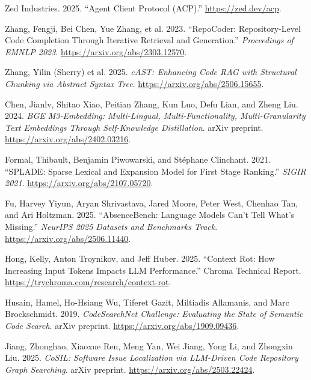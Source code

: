 \documentclass[
  11pt,
  letterpaper,
  numbers=noendperiod,
  parskip=half]{scrartcl}
\newlength{\cslhangindent}
\newenvironment{CSLReferences}[2] %
 {\begin{list}{}{%
  \setlength{\itemindent}{0pt}
  \setlength{\leftmargin}{0pt}
  \setlength{\parsep}{0pt}
  \ifodd #1
   \setlength{\leftmargin}{\cslhangindent}
   \setlength{\itemindent}{-1\cslhangindent}
  \fi
  \setlength{\itemsep}{#2\baselineskip}}}
 {\end{list}}
\begin{document}
\begin{CSLReferences}{1}{1}
Zed Industries. 2025. {``Agent Client Protocol ({ACP}).''}
\url{https://zed.dev/acp}.

Zhang, Fengji, Bei Chen, Yue Zhang, et al. 2023. {``{RepoCoder}:
Repository-Level Code Completion Through Iterative Retrieval and
Generation.''} \emph{Proceedings of EMNLP 2023}.
\url{https://arxiv.org/abs/2303.12570}.

{Zhang, Yilin (Sherry) et al.} 2025. \emph{{cAST}: Enhancing Code RAG
with Structural Chunking via Abstract Syntax Tree}.
\url{https://arxiv.org/abs/2506.15655}.

Chen, Jianlv, Shitao Xiao, Peitian Zhang, Kun Luo, Defu Lian, and Zheng
Liu. 2024. \emph{{BGE M3}-Embedding: Multi-Lingual,
Multi-Functionality, Multi-Granularity Text Embeddings Through
Self-Knowledge Distillation}. arXiv preprint.
\url{https://arxiv.org/abs/2402.03216}.

Formal, Thibault, Benjamin Piwowarski, and Stéphane Clinchant. 2021.
{``{SPLADE}: Sparse Lexical and Expansion Model for First Stage
Ranking.''} \emph{SIGIR 2021}. \url{https://arxiv.org/abs/2107.05720}.

Fu, Harvey Yiyun, Aryan Shrivastava, Jared Moore, Peter West, Chenhao
Tan, and Ari Holtzman. 2025. {``AbsenceBench: Language Models Can't Tell
What's Missing.''} \emph{NeurIPS 2025 Datasets and Benchmarks Track}.
\url{https://arxiv.org/abs/2506.11440}.

Hong, Kelly, Anton Troynikov, and Jeff Huber. 2025. {``Context Rot: How
Increasing Input Tokens Impacts LLM Performance.''} Chroma Technical
Report. \url{https://trychroma.com/research/context-rot}.

Husain, Hamel, Ho-Hsiang Wu, Tiferet Gazit, Miltiadis Allamanis, and
Marc Brockschmidt. 2019. \emph{CodeSearchNet Challenge: Evaluating the
State of Semantic Code Search}. arXiv preprint.
\url{https://arxiv.org/abs/1909.09436}.

Jiang, Zhonghao, Xiaoxue Ren, Meng Yan, Wei Jiang, Yong Li, and Zhongxin
Liu. 2025. \emph{{CoSIL}: Software Issue Localization via LLM-Driven
Code Repository Graph Searching}. arXiv preprint.
\url{https://arxiv.org/abs/2503.22424}.


\end{CSLReferences}
\end{document}
